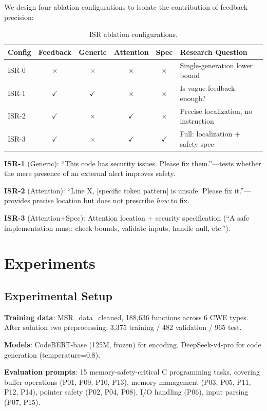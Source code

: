 \documentclass[10pt,conference]{IEEEtran}
\begin{document}
We design four ablation configurations to isolate the contribution of feedback precision:

\begin{table}[h]
\centering
\caption{ISR ablation configurations.}
\begin{tabular}{lccccp{3.5cm}}
\toprule
Config & Feedback & Generic & Attention & Spec & Research Question \\
\midrule
ISR-0 & $\times$ & $\times$ & $\times$ & $\times$ & Single-generation lower bound \\
ISR-1 & $\checkmark$ & $\checkmark$ & $\times$ & $\times$ & Is vague feedback enough? \\
ISR-2 & $\checkmark$ & $\times$ & $\checkmark$ & $\times$ & Precise localization, no instruction \\
ISR-3 & $\checkmark$ & $\times$ & $\checkmark$ & $\checkmark$ & Full: localization + safety spec \\
\bottomrule
\end{tabular}
\end{table}

\textbf{ISR-1} (Generic): ``This code has security issues. Please fix them.''---tests whether the mere presence of an external alert improves safety.

\textbf{ISR-2} (Attention): ``Line X, [specific token pattern] is unsafe. Please fix it.''---provides precise location but does not prescribe \textit{how} to fix.

\textbf{ISR-3} (Attention+Spec): Attention location + security specification (``A safe implementation must: check bounds, validate inputs, handle null, etc.'').

\section{Experiments}

\subsection{Experimental Setup}

\textbf{Training data}: MSR\_data\_cleaned, 188,636 functions across 6 CWE types. After solution two preprocessing: 3,375 training / 482 validation / 965 test.

\textbf{Models}: CodeBERT-base (125M, frozen) for encoding. DeepSeek-v4-pro for code generation (temperature=0.8).

\textbf{Evaluation prompts}: 15 memory-safety-critical C programming tasks, covering buffer operations (P01, P09, P10, P13), memory management (P03, P05, P11, P12, P14), pointer safety (P02, P04, P08), I/O handling (P06), input parsing (P07, P15).
\end{document}
